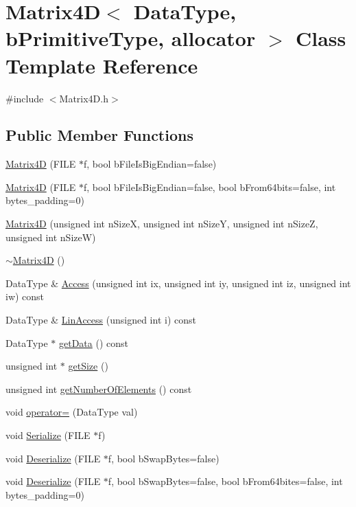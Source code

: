\hypertarget{class_matrix4_d}{}\section{Matrix4\+D$<$ Data\+Type, b\+Primitive\+Type, allocator $>$ Class Template Reference}
\label{class_matrix4_d}


{\ttfamily \#include $<$Matrix4\+D.\+h$>$}

\subsection*{Public Member Functions}
\begin{DoxyCompactItemize}
\item 
\hyperlink{class_matrix4_d_a05f6e88624c8cf8bfff8f854005588b3}{Matrix4\+D} (F\+I\+L\+E $\ast$f, bool b\+File\+Is\+Big\+Endian=false)
\item 
\hyperlink{class_matrix4_d_a7b656177fe4ad5384d583f75696299fb}{Matrix4\+D} (F\+I\+L\+E $\ast$f, bool b\+File\+Is\+Big\+Endian=false, bool b\+From64bits=false, int bytes\+\_\+padding=0)
\item 
\hyperlink{class_matrix4_d_ad42db5d6887aee94fd7e82110d5666d5}{Matrix4\+D} (unsigned int n\+Size\+X, unsigned int n\+Size\+Y, unsigned int n\+Size\+Z, unsigned int n\+Size\+W)
\item 
\hyperlink{class_matrix4_d_a06b661f5cba7abce0928f8a386759502}{$\sim$\+Matrix4\+D} ()
\item 
Data\+Type \& \hyperlink{class_matrix4_d_a41a8cc58d99d11846d486178a4620fcb}{Access} (unsigned int ix, unsigned int iy, unsigned int iz, unsigned int iw) const 
\item 
Data\+Type \& \hyperlink{class_matrix4_d_aa87da2d885eb60fd151148a492ec380e}{Lin\+Access} (unsigned int i) const 
\item 
Data\+Type $\ast$ \hyperlink{class_matrix4_d_a78a2d7181bc463309920aceba752ae18}{get\+Data} () const 
\item 
unsigned int $\ast$ \hyperlink{class_matrix4_d_a9c8afb2fce60f2ba1f594502d1c9c11f}{get\+Size} ()
\item 
unsigned int \hyperlink{class_matrix4_d_abad4f62b6a26a730f025952e243cfeeb}{get\+Number\+Of\+Elements} () const 
\item 
void \hyperlink{class_matrix4_d_ada53327de44528b2c849b74a4650ad20}{operator=} (Data\+Type val)
\item 
void \hyperlink{class_matrix4_d_a3e84cb30454e1b54f5018dbfecf48858}{Serialize} (F\+I\+L\+E $\ast$f)
\item 
void \hyperlink{class_matrix4_d_a7380a32c105c5d41c45b47ccdb3948a2}{Deserialize} (F\+I\+L\+E $\ast$f, bool b\+Swap\+Bytes=false)
\item 
void \hyperlink{class_matrix4_d_a1af167131c83c57271f1e31359928ed0}{Deserialize} (F\+I\+L\+E $\ast$f, bool b\+Swap\+Bytes=false, bool b\+From64bites=false, int bytes\+\_\+padding=0)
\end{DoxyCompactItemize}



